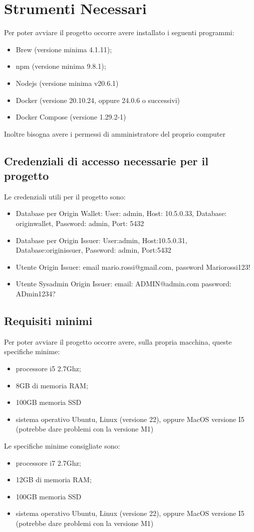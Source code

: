 \section{Strumenti Necessari}
Per poter avviare il progetto occorre avere installato i seguenti programmi:
\begin{itemize}
   \item  Brew (versione minima 4.1.11);
   \item  npm (versione minima 9.8.1);
   \item  Nodejs (versione minima v20.6.1)
   \item  Docker (versione 20.10.24, oppure 24.0.6 o successivi)
   \item Docker Compose (versione 1.29.2-1)
\end{itemize}
Inoltre bisogna avere i permessi di amministratore del proprio computer



\subsection{Credenziali di accesso necessarie per il progetto}
Le credenziali utili per il progetto sono:
\begin{itemize}
   \item Database per Origin Wallet: User: admin, Host: 10.5.0.33, Database: originwallet, Password: admin, Port: 5432
   \item Database per Origin Issuer: User:admin, Host:10.5.0.31, Database:originissuer, Password: admin, Port:5432
   \item Utente Origin Issuer: email mario.rossi@gmail.com, password Mariorossi123!
   \item Utente Sysadmin Origin Issuer: email: ADMIN@admin.com password: ADmin1234?
\end{itemize}

\subsection{Requisiti minimi}
Per poter avviare il progetto occorre avere, sulla propria macchina, queste specifiche minime:
\begin{itemize}
   \item processore i5 2.7Ghz;
   \item 8GB di memoria RAM;
   \item 100GB memoria SSD
   \item sistema operativo Ubuntu, Linux (versione 22), oppure MacOS versione I5 (potrebbe dare problemi con la versione M1)
\end{itemize}
Le specifiche minime consigliate sono:
\begin{itemize}
   \item processore i7 2.7Ghz;
   \item 12GB di memoria RAM;
   \item 100GB memoria SSD
   \item sistema operativo Ubuntu, Linux (versione 22), oppure MacOS versione I5 (potrebbe dare problemi con la versione M1)
\end{itemize}

